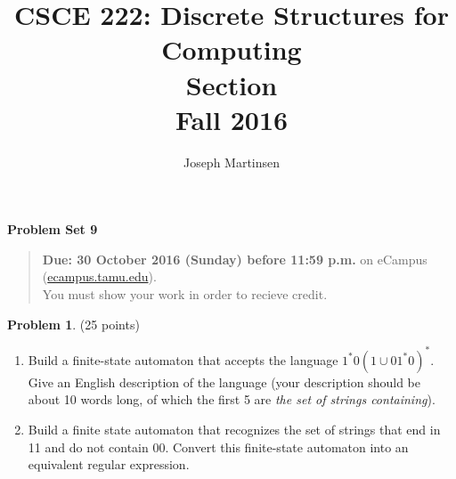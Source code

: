 \documentclass{article}
\title{CSCE 222: Discrete Structures for Computing\\Section \mysectionnumber\\Fall 2016}
\author{Joseph Martinsen}
\theoremstyle{definition}
\newtheorem{problem}{Problem}
\newcommand{\problemset}[1]{\begin{center}\textbf{Problem Set #1}\end{center}}
\newcommand{\duedate}[1]{\begin{quote}\textbf{Due: #1} on eCampus (\url{ecampus.tamu.edu}). \\You must show your work in order to recieve credit.\end{quote}}
\begin{document}
\maketitle

\problemset{9}

\duedate{30 October 2016 (Sunday) before 11:59 p.m.}

\bigskip

\begin{problem} (25 points)\\
\begin{enumerate}
\item Build a finite-state automaton that accepts the language $1^*0(1\cup01^*0)^*$.  Give an English description of the language (your description should be about 10 words long, of which the first 5 are \textit{the set of strings containing}).
\item Build a finite state automaton that recognizes the set of strings that end in 11 and do not contain 00. Convert this finite-state automaton into an equivalent regular expression.

\end{enumerate}
\end{problem}
\end{document}
